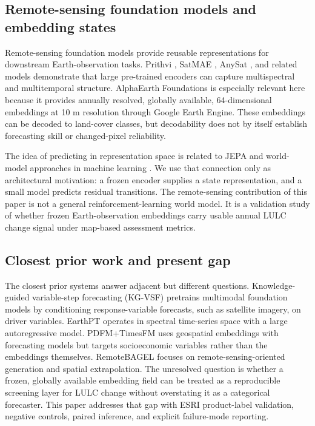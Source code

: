 \documentclass{article}
\begin{document}
\subsection{Remote-sensing foundation models and embedding states}

Remote-sensing foundation models provide reusable representations for downstream Earth-observation tasks. Prithvi \citep{jakubik2024prithvi}, SatMAE \citep{cong2022satmae}, AnySat \citep{astruc2024anysat}, and related models demonstrate that large pre-trained encoders can capture multispectral and multitemporal structure. AlphaEarth Foundations \citep{brown2025alphaearth} is especially relevant here because it provides annually resolved, globally available, 64-dimensional embeddings at 10 m resolution through Google Earth Engine. These embeddings can be decoded to land-cover classes, but decodability does not by itself establish forecasting skill or changed-pixel reliability.

The idea of predicting in representation space is related to JEPA and world-model approaches in machine learning \citep{lecun2022jepa,ha2018world,hafner2023dreamerv3}. We use that connection only as architectural motivation: a frozen encoder supplies a state representation, and a small model predicts residual transitions. The remote-sensing contribution of this paper is not a general reinforcement-learning world model. It is a validation study of whether frozen Earth-observation embeddings carry usable annual LULC change signal under map-based assessment metrics.

\subsection{Closest prior work and present gap}

The closest prior systems answer adjacent but different questions. Knowledge-guided variable-step forecasting (KG-VSF) \citep{mmvsf2024} pretrains multimodal foundation models by conditioning response-variable forecasts, such as satellite imagery, on driver variables. EarthPT \citep{smith2023earthpt} operates in spectral time-series space with a large autoregressive model. PDFM+TimesFM \citep{google2024pdfm} uses geospatial embeddings with forecasting models but targets socioeconomic variables rather than the embeddings themselves. RemoteBAGEL \citep{remotebagel2025} focuses on remote-sensing-oriented generation and spatial extrapolation. The unresolved question is whether a frozen, globally available embedding field can be treated as a reproducible screening layer for LULC change without overstating it as a categorical forecaster. This paper addresses that gap with ESRI product-label validation, negative controls, paired inference, and explicit failure-mode reporting.
\end{document}
